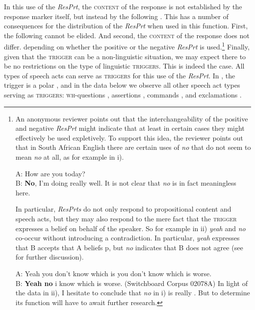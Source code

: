 \documentclass[output=paper]{LSP/langsci}
\begin{document}
\noindent In this use of the \textit{ResPrt}, the \textsc{content} of the response is not established by the response marker itself, but instead by the following .
This has a number of consequences for the distribution of the \textit{ResPrt} when used in this function. First, the following  cannot be elided.
And second, the \textsc{content} of the response does not differ. depending on whether the positive or the negative \textit{ResPrt} is used.\footnote{An anonymous reviewer points out that the interchangeability of the positive and negative \textit{ResPrt} might indicate that at least in certain cases they might effectively be used expletively. To support this idea, the reviewer points out that in South African English there are certain uses of \textit{no} that do not seem to mean \textit{no} at all, as for example in i).

\ea\upshape
A:  How are you today? \\
B: \textbf{No}, I’m doing really well. 
\z 
It is not clear that \textit{no} is in fact meaningless here.

In particular, \textit{ResPrts} do not only respond to propositional content and speech acts, but they may also respond to the mere fact that the \textsc{trigger} expresses a belief on behalf of the speaker. So for example in ii) \textit{yeah} and \textit{no} co-occur without introducing a contradiction. In particular, \textit{yeah} expresses that B accepts that A beliefs p, but \textit{no} indicates that B does not agree (see \citealt{Guntly2016yeahno,Guntly2016Wiltschkoktunaxa} for further discussion).

\ea\upshape
A:  Yeah you don't know which is you don't know which is worse. \\
B: \textbf{{Yeah no}} i know which is worse. (Switchboard Corpus 02078A)
\z In light of the data in ii), I hesitate to conclude that \textit{no} in i) is really . But to determine its function will have to await further research.}
Finally, given that the \textsc{trigger} can be a non-linguistic situation, we may expect there to be no restrictions on the type of linguistic \textsc{triggers. T}his is indeed the case.
All types of speech acts can serve as \textsc{triggers} for this use of the \textit{ResPrt}. In , the trigger is a polar , and in the data below we observe all other speech act types serving as \textsc{triggers: wh-}questions , assertions , commands , and exclamations .
\end{document}
